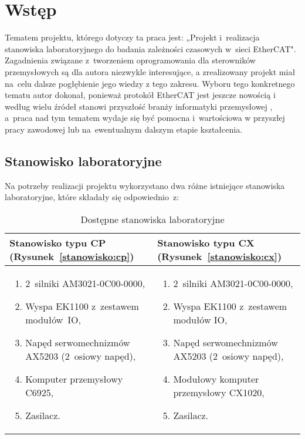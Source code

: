 \section{Wstęp}
Tematem projektu, którego dotyczy ta praca jest: „Projekt i~realizacja stanowiska laboratoryjnego do badania zależności czasowych w~sieci EtherCAT". Zagadnienia związane z~tworzeniem oprogramowania dla sterowników przemysłowych są dla autora niezwykle interesujące, a zrealizowany projekt miał na~celu dalsze pogłębienie jego wiedzy z tego zakresu. Wyboru tego konkretnego tematu autor dokonał, ponieważ protokół EtherCAT jest jeszcze nowością i według wielu źródeł stanowi przyszłość branży informatyki przemysłowej \cite{art1, art2}, a~praca nad tym tematem wydaje się być pomocna i~wartościowa w przyszłej pracy zawodowej lub na~ewentualnym dalszym etapie kształcenia.

\subsection{Stanowisko laboratoryjne}
Na potrzeby realizacji projektu wykorzystano dwa różne istniejące stanowiska laboratoryjne, które składały się odpowiednio~z:
\begin{table}[!htb]
\begin{center}
\begin{tabular}{| p{} || p{} |}\hline
Stanowisko typu CP (Rysunek~\ref{stanowisko:cp}) & Stanowisko typu CX (Rysunek~\ref{stanowisko:cx})  \\\hline
\begin{enumerate}
\item 2~silniki AM3021-0C00-0000,
\item Wyspa EK1100 z~zestawem modułów~IO,
\item Napęd serwomechnizmów AX5203 (2~osiowy napęd),
\item Komputer przemysłowy C6925,
\item Zasilacz.
\end{enumerate}
&
\begin{enumerate}
\item 2~silniki AM3021-0C00-0000,
\item Wyspa EK1100 z~zestawem modułów IO,
\item Napęd serwomechnizmów AX5203 (2~osiowy napęd),
\item Modułowy komputer przemysłowy CX1020,
\item Zasilacz.
\end{enumerate}
\\\hline                                            
\end{tabular}
\end{center}
\vspace*{-6mm}
  \caption{Dostępne stanowiska laboratoryjne}
	\label{in}
\end{table}

